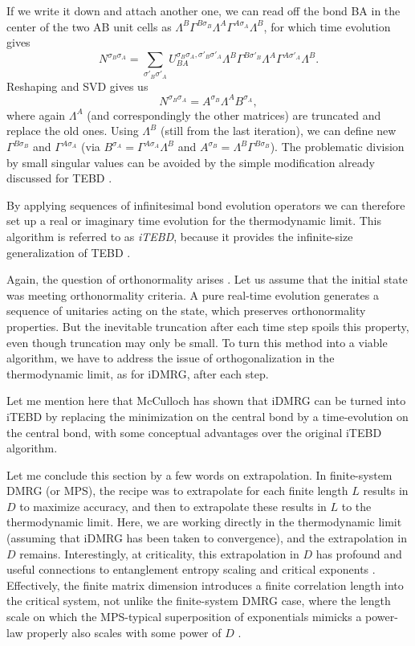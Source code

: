 If we write it down and attach another one, we can read off the bond BA in the center of the two AB unit cells as
$ \Lambda^B \Gamma^{B \sigma_{B}} \Lambda^A \Gamma^{A \sigma_{A}} \Lambda^B$, for which time evolution gives
\begin{equation}
N^{\sigma_{B}\sigma_{A}} = \sum_{\sigma'_{B}\sigma'_{A}} U_{BA}^ {\sigma_{B}\sigma_{A}, \sigma'_{B}\sigma'_{A}}  \Lambda^B \Gamma^{B \sigma'_{B}} \Lambda^A \Gamma^{A \sigma'_{A}} \Lambda^B .
\end{equation}
Reshaping and SVD gives us
\begin{equation}
N^{\sigma_{B}\sigma_{A}}=A^{\sigma_{B}} \Lambda^A B^{\sigma_{A}} ,
\end{equation}
where again $\Lambda^A$ (and correspondingly the other matrices) are truncated and replace the old ones. Using $\Lambda^B$ (still from the last iteration), we can define new $\Gamma^{B \sigma_{B}}$ and $\Gamma^{A \sigma_{A}} $ (via $B^{\sigma_{A}} =   \Gamma^{A \sigma_{A}} \Lambda^B$ and $A^{\sigma_{B}} =\Lambda^B \Gamma^{B \sigma_{B}}$). The problematic division by small singular values can be avoided by the simple modification already discussed for TEBD \cite{Hastings09}.

By applying sequences of infinitesimal bond evolution operators we can therefore set up a real or imaginary time evolution for the thermodynamic limit. This algorithm is referred to as {\em iTEBD}, because it provides the infinite-size generalization of TEBD \cite{Vidal07}.

Again, the question of orthonormality arises \cite{Orus08}. Let us assume that the initial state was meeting orthonormality criteria. A pure real-time evolution generates a sequence of unitaries acting on the state, which preserves orthonormality properties. But the inevitable truncation after each time step spoils this property, even though truncation may only be small. To turn this method into a viable algorithm, we have to address the issue of orthogonalization in the thermodynamic limit, as for iDMRG, after each step.

Let me mention here that McCulloch\cite{McCulloch08} has shown that iDMRG can be turned into iTEBD  by replacing the minimization on the central bond by a time-evolution on the central bond, with some conceptual advantages over the original iTEBD algorithm.

Let me conclude this section by a few words on extrapolation. In finite-system DMRG (or MPS), the recipe was to extrapolate for each finite length $L$ results in $D$ to maximize accuracy, and then to extrapolate these results in $L$ to the thermodynamic limit. Here, we are working directly in the thermodynamic limit (assuming that iDMRG has been taken to convergence), and the extrapolation in $D$ remains. Interestingly, at criticality, this extrapolation in $D$ has profound and useful connections to entanglement entropy scaling and critical exponents \cite{Tagliacozzo08}. Effectively, the finite matrix dimension introduces a finite correlation length into the critical system, not unlike the finite-system DMRG case, where the length scale on which the MPS-typical superposition of exponentials mimicks a power-law properly also scales with some power of $D$ \cite{Andersson99}.

